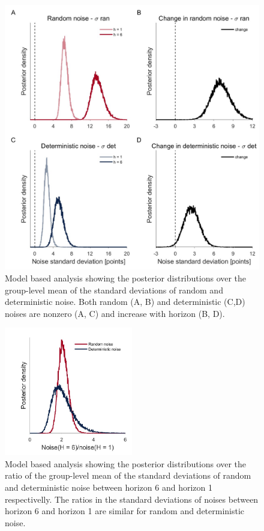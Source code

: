 \documentclass[12pt]{article}
\begin{document}
{\begin{figure}[H]
\begin{center}
	\includegraphics[width=\textwidth]{figures/RDBayes_hyperprior.jpg}
	\caption{Model based analysis showing the posterior distributions over the group-level mean of the standard deviations of  random and deterministic noise. Both random (A, B) and deterministic (C,D) noises are nonzero (A, C) and increase with horizon (B, D).  }
	\label{fig:mb1}
\end{center}
\end{figure}

\begin{figure}[H]
\begin{center}
	\includegraphics[width=0.5\textwidth]{figures/RDBayes_ratio.jpg}
	\caption{Model based analysis showing the posterior distributions over the ratio of the group-level mean of the standard deviations of  random and deterministic noise between horizon 6 and horizon 1 respectivelly. The ratios in the standard deviations of noises between horizon 6 and horizon 1 are similar for random and deterministic noise.}
	\label{fig:ratio}
\end{center}
\end{figure}

}
\end{document}
